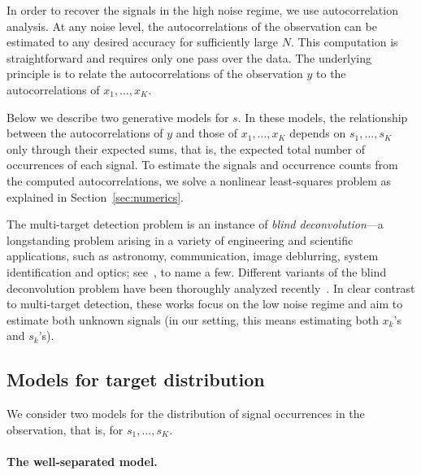 \documentclass[12pt]{article}
\newcommand{\1}{\mathbf{1}}
\theoremstyle{plain}
\theoremstyle{definition}
\theoremstyle{remark}
\theoremstyle{plain}
\theoremstyle{remark}
\theoremstyle{plain}
\theoremstyle{plain}
\theoremstyle{plain}
\numberwithin{equation}{section}
\begin{document}
In order to recover the signals in the high noise regime, we use autocorrelation analysis.
At any noise level, the autocorrelations of the observation can be estimated to any desired accuracy for sufficiently large  $N$. 
This computation is straightforward and requires only one pass over the data.
The underlying principle is to relate the autocorrelations of the observation $y$ to the autocorrelations of $x_1,\ldots,x_K$.

Below we describe two generative models for $s$.  
In these models, the relationship between the autocorrelations of $y$ and those of $x_1,\ldots,x_K$ depends on $s_1,\ldots,s_K$ only through their expected sums, that is, the expected total number of occurrences of each signal.
To estimate the signals and occurrence counts from the computed autocorrelations, we solve a nonlinear least-squares problem as explained in Section~\ref{sec:numerics}. 

The multi-target detection problem  is an instance of  
\emph{blind deconvolution}---a longstanding problem arising in a variety of engineering and scientific applications, such as astronomy, communication, image deblurring, system identification and optics; see~\cite{jefferies1993restoration,shalvi1990new,ayers1988iterative,abed1997blind}, to name a few. 
Different variants of the blind deconvolution problem have been thoroughly analyzed recently~\cite{ahmed2014blind,li2016identifiability,li2016rapid,lee2017blind,ling2017blind,kuo2019geometry}. In clear contrast to multi-target detection, these works focus on the low noise regime and aim to estimate both unknown signals (in our setting, this means estimating both $x_k$'s and $s_k$'s).

\subsection*{Models for target distribution}

We consider two  models for the distribution of signal occurrences in the observation, that is, for $s_1, \ldots, s_K$.

\paragraph{The well-separated model.}
\end{document}

